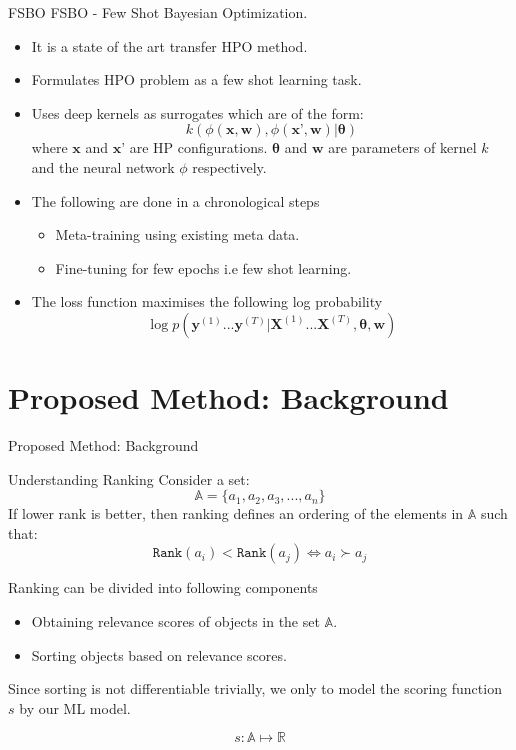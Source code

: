 \documentclass{beamer}
\begin{document}
\begin{frame}[t]{FSBO}
FSBO - Few Shot Bayesian Optimization.
\begin{itemize}
\item It is a state of the art transfer HPO method.
\item Formulates HPO problem as a few shot learning task.
\item Uses deep kernels as surrogates which are of the form:
$$
k(\phi(\textbf{x}, \textbf{w})  ,   \phi(\textbf{x'}, \textbf{w}) |  \mathbf{\theta})
$$
where $\textbf{x}$ and $\textbf{x'}$ are HP configurations. $\mathbf{\theta}$ and $\textbf{w}$ are parameters of kernel $k$ and the neural network $\phi$ respectively.

\item The following are done in a chronological steps
\begin{itemize}
\item Meta-training using existing meta data.
\item Fine-tuning for few epochs i.e few shot learning.
\end{itemize}
\item The loss function maximises the following log probability
$$
\log p( \textbf{y}^{(1)}...\textbf{y}^{(T)} | \textbf{X}^{(1)}...\textbf{X}^{(T)}, \mathbf{\theta}, \textbf{w})
$$

\end{itemize}

\end{frame}

\section{Proposed Method: Background}

\begin{frame}

\centering
\LARGE{Proposed Method: Background}

\end{frame}

\begin{frame}[t]{Understanding Ranking}
Consider a set:
$$
\mathbb{A} = \{a_1,  a_2,  a_3, ... ,  a_n\}
$$
If lower rank is better,  then ranking defines an ordering of the elements in $\mathbb{A}$ such that:
$$
\texttt{Rank}(a_i) < \texttt{Rank}(a_j) \iff a_i  \succ a_j
$$

Ranking can be divided into following components
\begin{itemize}
\item Obtaining relevance scores of objects in the set $\mathbb{A}$.
\item Sorting objects based on relevance scores.
\end{itemize}

Since sorting is not differentiable trivially,  we only to model the scoring function $s$ by our ML model.

$$
s : \mathbb{A} \mapsto \mathbb{R}
$$

\end{frame}
\end{document}
